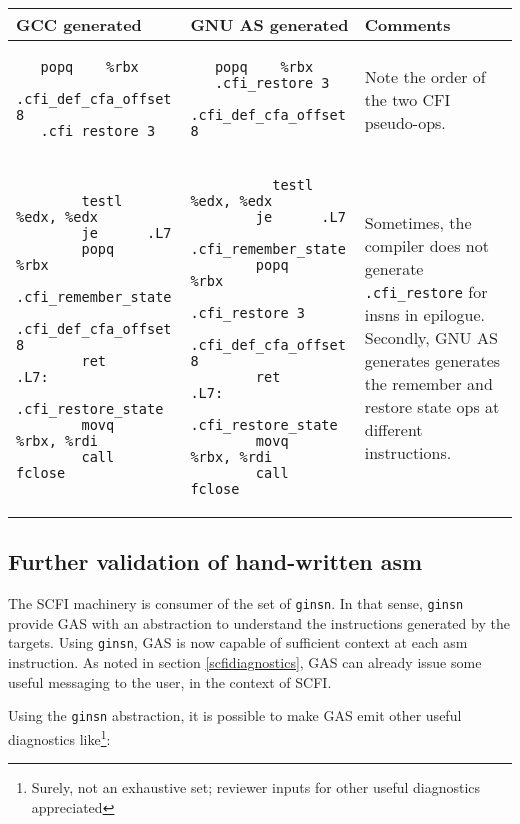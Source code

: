 \documentclass{article} \usepackage[a4paper, total={6in, 8in}]{geometry}
\begin{document}
\begin{center}
\begin{tabular}{ | m{5cm} | m{5cm}| m{3cm} |}
  \hline
  GCC generated & GNU AS generated & Comments \\
  \hline
  \begin{verbatim}
   popq    %rbx
   .cfi_def_cfa_offset 8
   .cfi_restore 3
   \end{verbatim}
   &
  \begin{verbatim}
   popq    %rbx
   .cfi_restore 3 
   .cfi_def_cfa_offset 8
   \end{verbatim}
   &
   Note the order of the two CFI pseudo-ops.
   \\
  \hline
  \begin{verbatim}
        testl   %edx, %edx
        je      .L7
        popq    %rbx
        .cfi_remember_state
        .cfi_def_cfa_offset 8
        ret
.L7:
        .cfi_restore_state
        movq    %rbx, %rdi
        call    fclose
   \end{verbatim}
   &
   \begin{verbatim}
          testl   %edx, %edx
        je      .L7
        .cfi_remember_state
        popq    %rbx
        .cfi_restore 3
        .cfi_def_cfa_offset 8
        ret
.L7:
        .cfi_restore_state
        movq    %rbx, %rdi
        call    fclose
   \end{verbatim}
   & Sometimes, the compiler does not generate \texttt{.cfi\_restore} for insns
   in epilogue.  Secondly, GNU AS generates generates the remember and restore
   state ops at different instructions.
   \\
   \hline
\end{tabular}
\end{center}

\subsection{Further validation of hand-written asm}
The SCFI machinery is consumer of the set of \texttt{ginsn}.  In that sense,
\texttt{ginsn} provide GAS with an abstraction to understand the
instructions generated by the targets.  Using \texttt{ginsn}, GAS is now
capable of sufficient context at each asm instruction.  As noted in section
\ref{scfidiagnostics}, GAS can already issue some useful messaging to the user,
  in the context of SCFI.

Using the \texttt{ginsn} abstraction, it is possible to make GAS emit other
useful diagnostics like\footnote{Surely, not an exhaustive set; reviewer inputs
for other useful diagnostics appreciated}:
\end{document}
